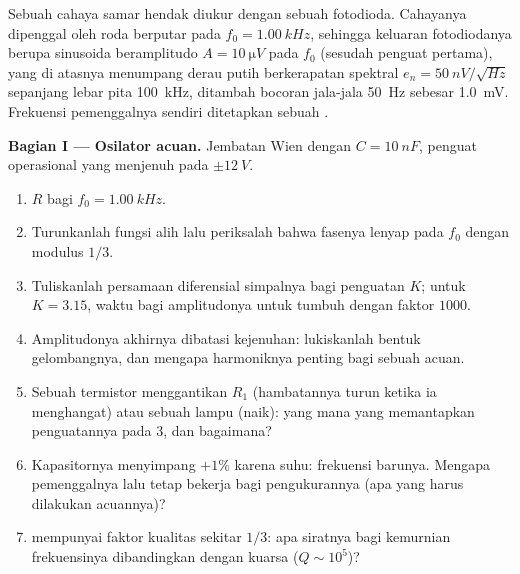 \begin{problem}
\label{pb:b2:feedback-oscillators:1}

Sebuah cahaya samar hendak diukur dengan sebuah fotodioda. Cahayanya dipenggal
oleh roda berputar pada $f_0 = \qty{1.00}{kHz}$, sehingga keluaran
fotodiodanya berupa sinusoida beramplitudo $A = \qty{10}{\micro V}$ pada $f_0$ (sesudah
penguat pertama), yang di atasnya menumpang derau putih berkerapatan spektral
$e_n = \qty{50}{nV/\sqrt{Hz}}$ sepanjang lebar pita \qty{100}{kHz}, ditambah
bocoran jala-jala \qty{50}{Hz} sebesar \qty{1.0}{mV}. Frekuensi pemenggalnya sendiri
ditetapkan sebuah .

\medskip
\noindent\textbf{Bagian I --- Osilator acuan.}
Jembatan Wien dengan $C = \qty{10}{nF}$, penguat operasional yang menjenuh pada $\pm\qty{12}{V}$.
\begin{enumerate}
  \item $R$ bagi $f_0 = \qty{1.00}{kHz}$.
  \item Turunkanlah fungsi alih  lalu periksalah
        bahwa fasenya lenyap pada $f_0$ dengan modulus $1/3$.
  \item Tuliskanlah persamaan diferensial simpalnya bagi penguatan $K$; untuk
        $K = 3.15$, waktu bagi amplitudonya untuk tumbuh dengan faktor $1000$.
  \item Amplitudonya akhirnya dibatasi kejenuhan: lukiskanlah
        bentuk gelombangnya, dan mengapa harmoniknya penting bagi sebuah acuan.
  \item Sebuah termistor menggantikan $R_1$ (hambatannya turun ketika ia
        menghangat) atau sebuah lampu (naik): yang mana yang memantapkan penguatannya pada 3,
        dan bagaimana?
  \item Kapasitornya menyimpang $+1\%$ karena suhu: frekuensi barunya.
        Mengapa pemenggalnya lalu tetap bekerja bagi pengukurannya (apa
        yang harus dilakukan acuannya)?
  \item {} mempunyai faktor kualitas sekitar $1/3$: apa
        siratnya bagi kemurnian frekuensinya dibandingkan dengan
        kuarsa ($Q \sim 10^5$)?
\end{enumerate}


\end{problem}
